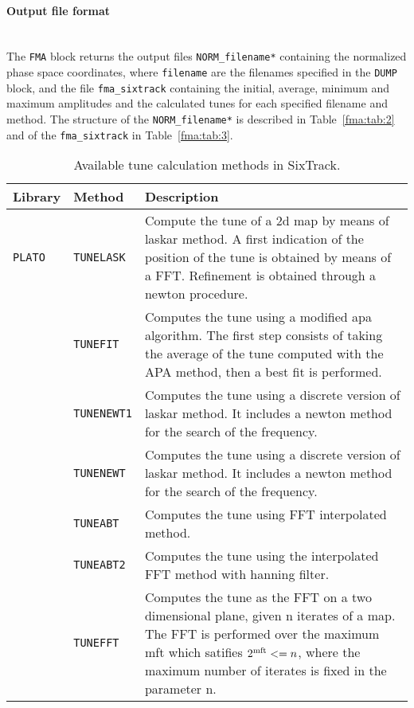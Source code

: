 \paragraph{Output file format}~\\

The \texttt{FMA} block returns the output files \texttt{NORM\_filename*} containing the normalized phase space coordinates, where \texttt{filename} are the filenames specified in the \texttt{DUMP} block, and the file \texttt{fma\_sixtrack} containing the initial, average, minimum and maximum amplitudes and the calculated tunes for each specified filename and method.
The structure of the \texttt{NORM\_filename*} is described in Table~\ref{fma:tab:2} and of the \texttt{fma\_sixtrack} in Table~\ref{fma:tab:3}.

\begin{table}[H]
\begin{center}
    \caption{Available tune calculation methods in SixTrack.}
    \label{fma:tab:1}
    \begin{tabularx}{\textwidth}{|l|l|X|}
    \hline
    \rowcolor{blue!30}
    \textbf{Library} & \textbf{Method} & \textbf{Description} \\
    \hline
    \texttt{PLATO} \cite{plato1,plato2}
    & \texttt{TUNELASK} & Compute the tune\index{tune} of a 2d map by means of laskar method. A first indication of the position of the tune is obtained by means of a FFT. Refinement is obtained through a newton procedure.\\
    \cline{2-3}
    & \texttt{TUNEFIT} & Computes the tune using a modified apa algorithm. The first step consists of taking the average of the tune computed with the APA method, then a best fit is performed.\\
    \cline{2-3}
    & \texttt{TUNENEWT1} & Computes the tune using a discrete version of laskar method. It includes a newton method for the search of the frequency.\\
    \cline{2-3}
    & \texttt{TUNENEWT} & Computes the tune using a discrete version of laskar method. It includes a newton method for the search of the frequency.\\
    \cline{2-3}
    & \texttt{TUNEABT} & Computes the tune using FFT\index{FFT} interpolated method.\\
    \cline{2-3}
    & \texttt{TUNEABT2} & Computes the tune using the interpolated FFT method with hanning filter.\\
    \cline{2-3}
    & \texttt{TUNEFFT} & Computes the tune as the FFT on a two dimensional plane, given n iterates of a map. The FFT is performed over the maximum mft which satifies $2^{\rm mft} <= n$, where the maximum number of iterates is fixed in the parameter n.\\

\end{tabularx}
\end{center}
\end{table}

